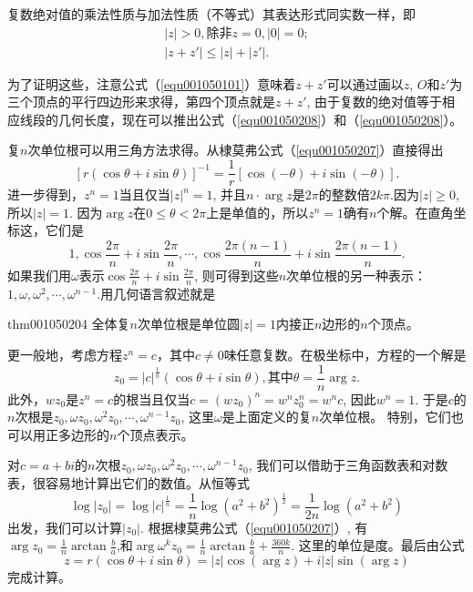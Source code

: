 复数绝对值的乘法性质与加法性质（不等式）其表达形式同实数一样，即
\begin{gather}
|z| > 0, \text{除非}z=0, |0|=0; \label{equ001050208}\\
|z+z'| \le |z| + |z'|.\label{equ001050209}
\end{gather}

为了证明这些，注意公式（\ref{equ001050101}）意味着$z+z'$可以通过画以$z$, $O$和$z'$为三个顶点的平行四边形来求得，第四个顶点就是$z + z'$, 由于复数的绝对值等于相应线段的几何长度，现在可以推出公式（\ref{equ001050208}）和（\ref{equ001050208}）。

复$n$次单位根可以用三角方法求得。从棣莫弗公式（\ref{equ001050207}）直接得出
\[
[r(\cos{\theta} + i\sin{\theta})]^{-1} = \frac{1}{r}[\cos{(-\theta)} + i\sin{(-\theta)}].
\]
进一步得到，$z^n=1$当且仅当$|z|^n = 1$, 并且$n\cdot \arg{z}$是$2\pi$的整数倍$2k\pi$.因为$|z| \ge 0$, 所以$|z| = 1$. 因为$\arg{z}$在$0 \le \theta < 2\pi$上是单值的，所以$z^n=1$确有$n$个解。在直角坐标这，它们是
\[
1, \cos{\frac{2\pi}{n}} + i\sin{\frac{2\pi}{n}},\cdots, \cos{\frac{2\pi(n-1)}{n}} + i\sin{\frac{2\pi(n-1)}{n}}.
\]
如果我们用$\omega$表示$\cos{\frac{2\pi}{n}} + i\sin{\frac{2\pi}{n}}$, 则可得到这些$n$次单位根的另一种表示：$1, \omega, \omega^2,\cdots, \omega^{n-1}$.用几何语言叙述就是
\begin{theorem}{}{thm001050204}
全体复$n$次单位根是单位圆$|z|=1$内接正$n$边形的$n$个顶点。
\end{theorem}

更一般地，考虑方程$z^n=c$，其中$c \neq 0$味任意复数。在极坐标中，方程的一个解是
\[
z_0 = |c|^{\frac{1}{n}}(\cos{\theta} + i\sin{\theta}), \text{其中}\theta = \frac{1}{n}\arg{z}.
\]
此外，$wz_0$是$z^n=c$的根当且仅当$c = (wz_0)^n = w^nz_0^n = w^nc$, 因此$w^n=1$. 于是$c$的$n$次根是$z_0, \omega{}z_0, \omega^2z_0,\cdots, \omega^{n-1}z_0$, 这里$\omega$是上面定义的复$n$次单位根。 特别，它们也可以用正多边形的$n$个顶点表示。

对$c = a+bi$的$n$次根$z_0, \omega{}z_0, \omega^2z_0, \cdots, \omega^{n-1}z_0$, 我们可以借助于三角函数表和对数表，很容易地计算出它们的数值。从恒等式
\[
\log{|z_0|} = \log{|c|^{\frac{1}{n}}} = \frac{1}{n}\log{(a^2+b^2)^{\frac{1}{2}}} = \frac{1}{2n}\log(a^2+b^2)
\]
出发，我们可以计算$|z_0|$. 根据棣莫弗公式（\ref{equ001050207}）, 有$\arg{z_0} = \frac{1}{n}\arctan{\frac{b}{a}}$,和$
\arg{\omega^{k}z_0} = \frac{1}{n}\arctan{\frac{b}{a}} + \frac{360k}{n}$. 这里的单位是度。最后由公式
\[
z = r(\cos{\theta} + i\sin{\theta}) = |z|\cos{(\arg{z})} + i|z|\sin{(\arg{z})}
\]
完成计算。

